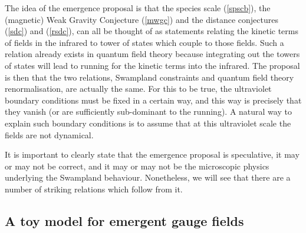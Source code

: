 \documentclass[11pt,a4paper]{article}
\numberwithin{equation}{section}
\numberwithin{table}{section}\setlength{\multlinegap}{25pt}
\begin{document}
{The idea of the emergence proposal is that the species scale (\ref{spscb}), the (magnetic) Weak Gravity Conjecture (\ref{mwgc}) and the distance conjectures (\ref{sdc}) and (\ref{rsdc}), can all be thought of as statements relating the kinetic terms of fields in the infrared to tower of states which couple to those fields. Such a relation already exists in quantum field theory because integrating out the towers of states will lead to running for the kinetic terms into the infrared. The proposal is then that the two relations, Swampland constraints and quantum field theory renormalisation, are actually the same. For this to be true, the ultraviolet boundary conditions must be fixed in a certain way, and this way is precisely that they vanish (or are sufficiently sub-dominant to the running). A natural way to explain such boundary conditions is to assume that at this ultraviolet scale the fields are not dynamical. 

It is important to clearly state that the emergence proposal is speculative, it may or may not be correct, and it may or may not be the microscopic physics underlying the Swampland behaviour. Nonetheless, we will see that there are a number of striking relations which follow from it.

\subsection{A toy model for emergent gauge fields}
\label{sec:cpNmodel}

}
\end{document}
